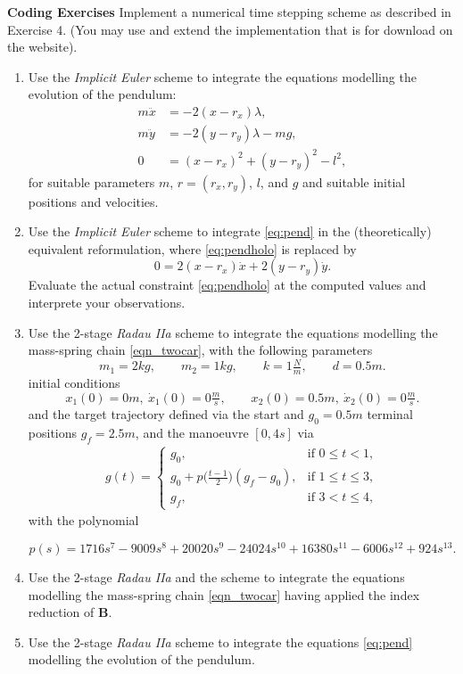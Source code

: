 \documentclass[a4paper,10pt]{article}
\begin{document}
\newpage
{\bf Coding Exercises}
Implement a numerical time stepping scheme as described in Exercise 4. (You may use and extend the implementation that is for download on the website).
\begin{enumerate}
	\item Use the \emph{Implicit Euler} scheme to integrate the equations modelling the evolution of the pendulum:
		\begin{subequations}\label{eq:pend}
			\begin{align}
				m\ddot x &= - 2(x-r_x)\lambda, \\
				m\ddot y &= - 2(y-r_y)\lambda - mg, \\
				0 &= (x-r_x)^{2} + (y-r_y)^2 - l^2, \label{eq:pendholo}
			\end{align}
		\end{subequations}
		for suitable parameters $m$, $r=(r_x, r_y)$, $l$, and $g$ and suitable initial positions and velocities.

	\item Use the \emph{Implicit Euler} scheme to integrate \eqref{eq:pend} in the (theoretically) equivalent reformulation, where \eqref{eq:pendholo} is replaced by 
		\begin{equation*}
			0 = 2(x-r_x)\dot x + 2(y-r_y)\dot y.
		\end{equation*}
		Evaluate the actual constraint \eqref{eq:pendholo} at the computed values and interprete your observations.
	\item Use the 2-stage \emph{Radau IIa} scheme to integrate the equations modelling the mass-spring chain \eqref{eqn_twocar}, with the following parameters
%
\[
  m_1 = 2 kg,\qquad 
  m_2 = 1 kg, \qquad
  k = 1 \tfrac Nm, \qquad 
  d = 0.5m.
\]
%
initial conditions
\[
  x_1(0) = 0 m,\ \dot x_1(0)  = 0 \tfrac ms, \qquad
x_2(0) = 0.5 m,\ \dot x_2(0) = 0 \tfrac ms.
\]
%
and the target trajectory defined via the start and $g_0 = 0.5m$ terminal positions $g_f = 2.5m$, and the manoeuvre $[0, 4s]$ via 
%
\begin{align*}
 g(t) = 
 \begin{cases}
	 g_0, 	& \text{if }0\leq t < 1, \\
	 g_0 + p\big(\frac{t-1}{2} \big) (g_f-g_0), 	& \text{if }1\leq t \leq 3, \\
	 g_f, 	& \text{if } 3 < t \leq 4,
 \end{cases}
\end{align*}
with the polynomial

%
\[
  p(s) = 1716 s^7 - 9009s^8 + 20020s^9 - 24024s^{10 }+ 16380s^{11 }- 6006s^{12 }+ 924s^{13}.
\]
%

	\item Use the 2-stage \emph{Radau IIa} and the scheme to integrate the equations modelling the mass-spring chain \eqref{eqn_twocar} having applied the index reduction of \textbf{B}.
	\item Use the 2-stage \emph{Radau IIa} scheme to integrate the equations \eqref{eq:pend} modelling the evolution of the pendulum. 
\end{enumerate}
\end{document}

